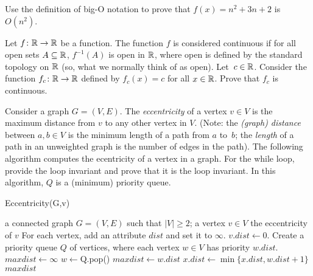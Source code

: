 \documentclass{article}
\begin{document}
\nextprob{}
Use the definition of big-O notation to prove that $f(x)=n^2 + 3n +2$ is
$O(n^2)$.

\nextprob{}
Let $f \colon {\mathbb R} \to {\mathbb R}$ be a function.
The function $f$ is considered continuous if for all open sets $A \subseteq {\mathbb R}$,
$f^{-1}(A)$ is open in ${\mathbb R}$, where open is defined by the standard topology on
${\mathbb R}$ (so, what we normally think of as open).  Let~$c \in {\mathbb R}$.  Consider the
function $f_c \colon {\mathbb R} \to {\mathbb R}$ defined by $f_c(x) = c$ for all $x \in {\mathbb R}$. Prove
that $f_c$ is continuous.

\nextprob{}

Consider a graph $G=(V,E)$. The \emph{eccentricity} of a vertex $v \in V$ is the
maximum distance from $v$ to any other vertex in $V$. (Note: the \emph{(graph) distance} between
$a,b\in V$ is the minimum length of a path from $a$ to~$b$; the \emph{length} of
a path in an unweighted graph is the number of edges in the path). The
following algorithm computes the ecentricity of a vertex in a graph.  For the
while loop, provide the loop invariant and prove that it is the loop invariant.
In this algorithm, $Q$ is a (minimum) priority queue.

\begin{algorithm}
    \caption{Eccentricity(G,v)}
    \begin{algorithmic}[1]
        \REQUIRE a connected graph $G=(V,E)$ such that $|V| \geq 2$; a vertex $v \in V$
        \ENSURE the eccentricity of $v$
        \STATE For each vertex, add an attribute $dist$ and set it to $\infty$.
        \STATE $v.dist \gets 0$.
        \STATE Create a priority queue $Q$ of vertices, where each
                vertex $w\in V$ has priority $w.dist$.
        \STATE $maxdist \gets \infty$
            \STATE $w \gets $Q.pop() 
            \STATE $maxdist \gets w.dist$
                \STATE $x.dist \gets \min \{ x.dist, w.dist +1 \} $
            \ENDFOR
        \ENDWHILE
        \RETURN $maxdist$
    \end{algorithmic}
\end{algorithm}
\end{document}
